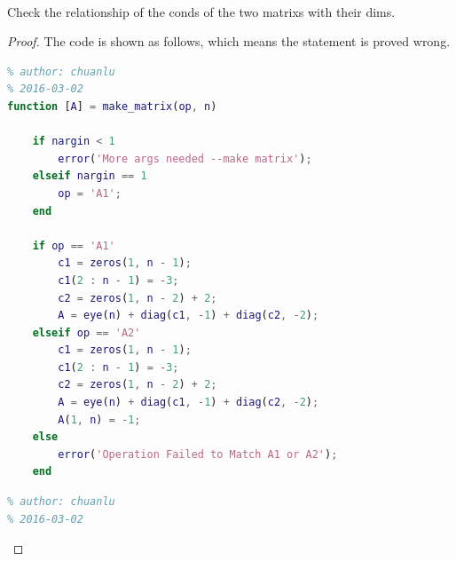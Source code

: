\documentclass[12pt]{article}
\newenvironment{problem}[2][Problem]{\begin{trivlist}
\item[\hskip \labelsep {\bfseries #1}\hskip \labelsep {\bfseries #2.}]}{\end{trivlist}}
\begin{document}
 
\begin{problem}{2}
\text{ }\\
Check the relationship of the conds of the two matrixs with their dims.
\end{problem}
\begin{proof}
The code is shown as follows, which means the statement is proved wrong.
\begin{lstlisting}[language={MATLAB}]
% make matrix
% author: chuanlu
% 2016-03-02
function [A] = make_matrix(op, n)
    
    if nargin < 1
        error('More args needed --make matrix');
    elseif nargin == 1
        op = 'A1';
    end
    
    if op == 'A1'
        c1 = zeros(1, n - 1);
        c1(2 : n - 1) = -3;
        c2 = zeros(1, n - 2) + 2;
        A = eye(n) + diag(c1, -1) + diag(c2, -2);
    elseif op == 'A2'
        c1 = zeros(1, n - 1);
        c1(2 : n - 1) = -3;
        c2 = zeros(1, n - 2) + 2;
        A = eye(n) + diag(c1, -1) + diag(c2, -2);
        A(1, n) = -1;
    else
        error('Operation Failed to Match A1 or A2');
    end
\end{lstlisting}

\begin{lstlisting}[language={MATLAB}]
% homework2.m
% author: chuanlu
% 2016-03-02


\end{lstlisting}
\end{proof}
\end{document}
